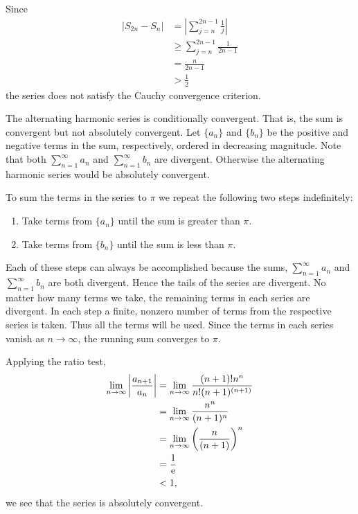 {\begin{Solution}
  \label{solution divergent harmonic series}
  Since
  \begin{align*}
    |S_{2 n} - S_n| 
    &= \left| \sum_{j=n}^{2 n-1} \frac{1}{j} \right| 
    \\
    &\geq \sum_{j=n}^{2 n-1} \frac{1}{2 n-1} 
    \\
    &= \frac{n}{2 n-1} 
    \\
    &> \frac{1}{2}
  \end{align*}
  the series does not satisfy the Cauchy convergence criterion.  
\end{Solution}


\begin{Solution}
  \label{solution rearrange alternating harmonic series}
  The alternating harmonic series is conditionally convergent.  That is, 
  the sum is convergent but not absolutely convergent.
  Let $\{a_n\}$ and $\{b_n\}$ be the positive and negative terms in the sum, 
  respectively, ordered in decreasing magnitude.  Note that both $\sum_{n = 1}^\infty a_n$
  and $\sum_{n = 1}^\infty b_n$ are divergent.  Otherwise the alternating harmonic series
  would be absolutely convergent.  

  To sum the terms in the series to $\pi$ we repeat the following two steps 
  indefinitely:
  \begin{enumerate}
  \item Take terms from $\{a_n\}$ until the sum is greater than $\pi$.
  \item Take terms from $\{b_n\}$ until the sum is less than $\pi$.
  \end{enumerate}
  Each of these steps can always be accomplished because the sums, 
  $\sum_{n = 1}^\infty a_n$ and $\sum_{n = 1}^\infty b_n$ are both divergent.  Hence the tails 
  of the series are divergent.  No matter how many terms we take, the 
  remaining terms in each series are divergent.  In each step a finite, nonzero
  number of terms from the respective series is taken.  Thus all the terms 
  will be used.  Since the terms in each
  series vanish as $n \to \infty$, the running sum converges to $\pi$.
\end{Solution}


\begin{Solution}
  \label{solution sum n!/n^n}
  Applying the ratio test,
  \begin{align*}
    \lim_{n \to \infty} \left| \frac{a_{n+1}}{a_n} \right|
    &= \lim_{n \to \infty} \frac{(n+1)! n^n}{n! (n+1)^{(n+1)}} 
    \\
    &= \lim_{n \to \infty} \frac{n^n}{(n+1)^n} 
    \\
    &= \lim_{n \to \infty} \left( \frac{n}{(n + 1)} \right)^n 
    \\
    &= \frac{1}{\mathop{\mathrm{e}}\nolimits} 
    \\
    &< 1,
  \end{align*}
  we see that the series is absolutely convergent.
\end{Solution}


}

